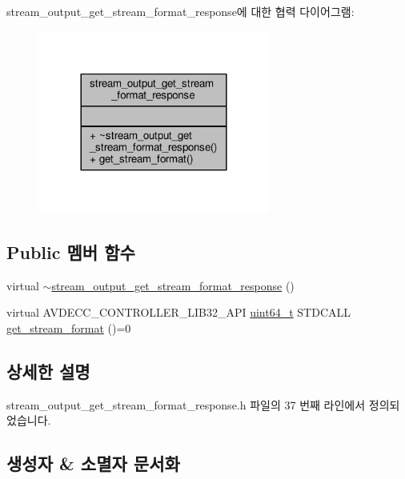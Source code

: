 stream\+\_\+output\+\_\+get\+\_\+stream\+\_\+format\+\_\+response에 대한 협력 다이어그램\+:
\nopagebreak
\begin{figure}[H]
\begin{center}
\leavevmode
\includegraphics[width=216pt]{classavdecc__lib_1_1stream__output__get__stream__format__response__coll__graph}
\end{center}
\end{figure}
\subsection*{Public 멤버 함수}
\begin{DoxyCompactItemize}
\item 
virtual \hyperlink{classavdecc__lib_1_1stream__output__get__stream__format__response_aee5ffe78780ab93dc97ba784e693d2f7}{$\sim$stream\+\_\+output\+\_\+get\+\_\+stream\+\_\+format\+\_\+response} ()
\item 
virtual A\+V\+D\+E\+C\+C\+\_\+\+C\+O\+N\+T\+R\+O\+L\+L\+E\+R\+\_\+\+L\+I\+B32\+\_\+\+A\+PI \hyperlink{parse_8c_aec6fcb673ff035718c238c8c9d544c47}{uint64\+\_\+t} S\+T\+D\+C\+A\+LL \hyperlink{classavdecc__lib_1_1stream__output__get__stream__format__response_aba7b3a3a06d9c53ef54e43787fa46a7a}{get\+\_\+stream\+\_\+format} ()=0
\end{DoxyCompactItemize}


\subsection{상세한 설명}


stream\+\_\+output\+\_\+get\+\_\+stream\+\_\+format\+\_\+response.\+h 파일의 37 번째 라인에서 정의되었습니다.



\subsection{생성자 \& 소멸자 문서화}
